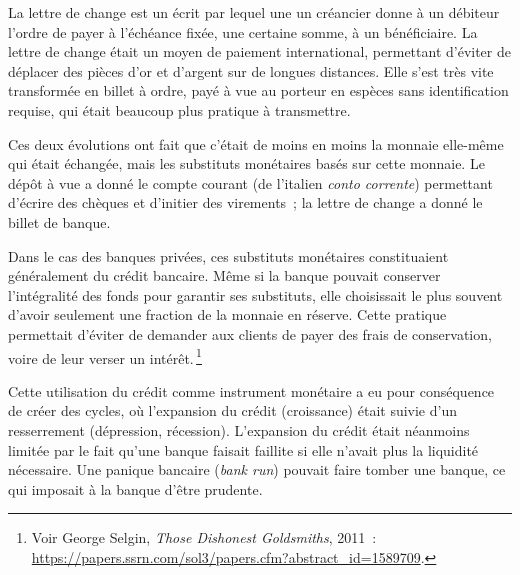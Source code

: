 \documentclass[a4paper,notitlepage]{article}
\newcommand{\eng}[1]{{\NoAutoSpaceBeforeFDP\emph{#1}}}  %
\newcommand{\sfootnote}{\,\footnote}
\begin{document}
La lettre de change est un écrit par lequel une un créancier donne à un débiteur l'ordre de payer à l'échéance fixée, une certaine somme, à un bénéficiaire. La lettre de change était un moyen de paiement international, permettant d'éviter de déplacer des pièces d'or et d'argent sur de longues distances. Elle s'est très vite transformée en billet à ordre, payé à vue au porteur en espèces sans identification requise, qui était beaucoup plus pratique à transmettre.

Ces deux évolutions ont fait que c'était de moins en moins la monnaie elle-même qui était échangée, mais les substituts monétaires basés sur cette monnaie. Le dépôt à vue a donné le compte courant (de l'italien \emph{conto corrente}) permettant d'écrire des chèques et d'initier des virements~; la lettre de change a donné le billet de banque.

Dans le cas des banques privées, ces substituts monétaires constituaient généralement du crédit bancaire. Même si la banque pouvait conserver l'intégralité des fonds pour garantir ses substituts, elle choisissait le plus souvent d'avoir seulement une fraction de la monnaie en réserve. Cette pratique permettait d'éviter de demander aux clients de payer des frais de conservation, voire de leur verser un intérêt.\sfootnote{Voir George Selgin, \eng{Those Dishonest Goldsmiths}, 2011~: \url{https://papers.ssrn.com/sol3/papers.cfm?abstract_id=1589709}.}

Cette utilisation du crédit comme instrument monétaire a eu pour conséquence de créer des cycles, où l'expansion du crédit (croissance) était suivie d'un resserrement (dépression, récession). L'expansion du crédit était néanmoins limitée par le fait qu'une banque faisait faillite si elle n'avait plus la liquidité nécessaire. Une panique bancaire (\eng{bank run}) pouvait faire tomber une banque, ce qui imposait à la banque d'être prudente.


\end{document}
